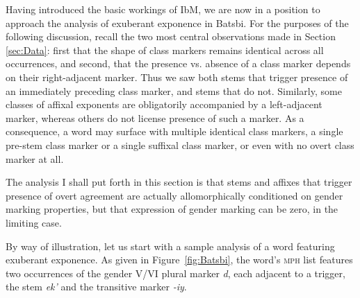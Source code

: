 \documentclass[output=paper]{langsci/langscibook}
\begin{document}
Having introduced the basic workings of IbM, we are now in a position
to approach the analysis of exuberant exponence in Batsbi. For the
purposes of the following discussion, recall the two most central
observations made in Section \ref{sec:Data}: first that the shape of class markers
remains identical across all occurrences, and second, that the presence
vs. absence of a class marker depends on their right-adjacent
marker. Thus we saw both stems that trigger presence of an immediately
preceding class marker, and stems that do not. Similarly, some classes
of affixal exponents are obligatorily accompanied by a left-adjacent
marker, whereas others do not license presence of such a marker. As a
consequence, a word may surface with multiple identical class
markers, a single pre-stem class marker or a single suffixal class
marker, or even with no overt class marker at all.

The analysis I shall put forth in this section is that stems and
affixes that trigger presence of overt agreement are actually 
allomorphically conditioned on gender marking properties, but that
expression of gender marking can be zero, in the limiting case. 

By way of illustration, let us start with a sample analysis of a word
featuring exuberant exponence. As given in Figure~\ref{fig:Batsbi},
the word's \textsc{mph} list features two occurrences of the gender V/VI plural
marker \textit{d}, each adjacent to a trigger, the stem \textit{ek'}
and the transitive marker \textit{-iy}. 
\end{document}
